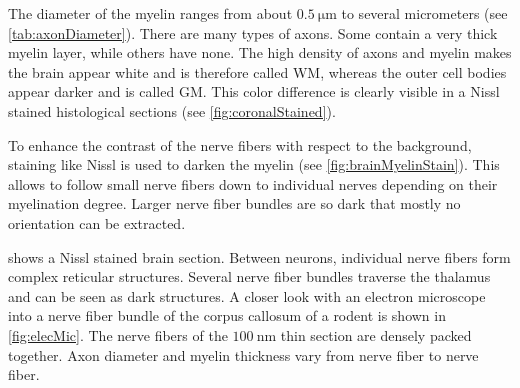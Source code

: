 The diameter of the myelin ranges from about $\SI{0.5}{\micro\meter}$ to several micrometers (see \cref{tab:axonDiameter}).
There are many types of axons.
Some contain a very thick myelin layer, while others have none.
The high density of axons and myelin makes the brain appear white and is therefore called \ac{WM}, whereas the outer cell bodies appear darker and is called \ac{GM}.
This color difference is clearly visible in a Nissl stained histological sections (see \cref{fig:coronalStained}).
\par
%
To enhance the contrast of the nerve fibers with respect to the background, staining like Nissl is used to darken the myelin (see \cref{fig:brainMyelinStain}).
This allows to follow small nerve fibers down to individual nerves depending on their myelination degree.
Larger nerve fiber bundles are so dark that mostly no orientation can be extracted.
\par
%
 shows a Nissl stained brain section.
Between neurons, individual nerve fibers form complex reticular structures.
Several nerve fiber bundles traverse the thalamus and can be seen as dark structures.
A closer look with an electron microscope into a nerve fiber bundle of the corpus callosum of a rodent is shown in \cref{fig:elecMic}.
The nerve fibers of the $\SI{100}{\nano\meter}$ thin section are densely packed together.
Axon diameter and myelin thickness vary from nerve fiber to nerve fiber.
%
